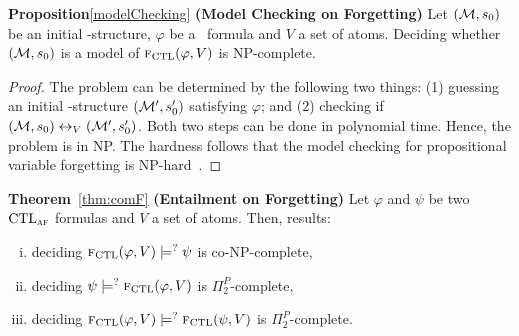 \documentclass[letterpaper]{article} %
\begin{document}
\textbf{Proposition}\ref{modelChecking}  \textbf{(Model Checking on Forgetting)} Let $({\cal M},s_0)$ be an initial \MPK-structure, $\varphi$ be a \CTL\ formula and $V$ a set of atoms. Deciding whether $({\cal M},s_0)$ is a model of ${\textsc{f}_{\textrm{CTL}}}(\varphi, V )$ is NP-complete.\\
\begin{proof}
The problem can be determined by the following two things: (1) guessing
an initial \MPK-structure $({\cal M}',s_0')$ satisfying $\varphi$; and
(2) checking if  $({\cal M}, s_0) \leftrightarrow_V ({\cal M}', s_0')$. Both two steps can be done in polynomial time.
 Hence, the problem is in NP.
The hardness follows that the model checking for propositional variable
forgetting is NP-hard~\cite{Zhang2008Properties}.
\end{proof}

\noindent\textbf{Theorem}~\ref{thm:comF} \textbf{(Entailment on Forgetting)}
Let $\varphi$ and $\psi$ be two $\textrm{CTL}_{\textsc{a} \textsc{f}}$  formulas and $V$ a set of atoms. Then,
results:
\begin{enumerate}[(i)]
  \item deciding  ${\textsc{f}_{\textrm{CTL}}}(\varphi, V ) \models^? \psi$ is co-NP-complete,
  \item deciding  $\psi \models^? {\textsc{f}_{\textrm{CTL}}}(\varphi, V)$ is $\Pi_2^P$-complete,
  \item deciding ${\textsc{f}_{\textrm{CTL}}}(\varphi, V) \models^? {\textsc{f}_{\textrm{CTL}}}(\psi, V)$ is $\Pi_2^P$-complete.
\end{enumerate}
\end{document}
